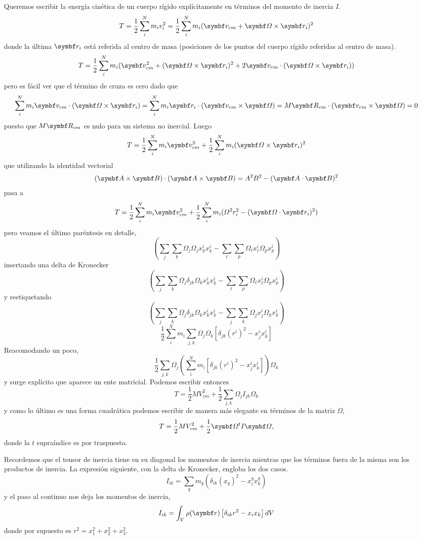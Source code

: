 \documentclass[10pt,oneside]{CBFT_book}
\begin{document}
Queremos escribir la energía cinética de un cuerpo rígido explícitamente en términos del momento
de inercia $I$.
\[
	T = \frac{1}{2} \sum_i^N m_i v_i^2 = \frac{1}{2} \sum_i^N m_i ( \vb{v}_{cm} + \vb{\Omega} \times \vb{r}_i ) ^2
\]
donde la última $\vb{r}_i$ está referida al centro de masa (posiciones de los puntos del cuerpo
rígido referidas al centro de masa).
\[
	T = \frac{1}{2} \sum_i^N m_i ( \vb{v}_{cm}^2 + (\vb{\Omega} \times \vb{r}_i)^2 +
		2 \vb{v}_{cm} \cdot (\vb{\Omega} \times \vb{r}_i)  )
\]
pero es fácil ver que el término de cruza es cero dado que 
\[
	\sum_i^N m_i \vb{v}_{cm} \cdot (\vb{\Omega} \times \vb{r}_i) = 
	\sum_i^N m_i \vb{r}_i \cdot ( \vb{v}_{cm} \times \vb{\Omega} ) = 
	M \vb{R}_{cm} \cdot ( \vb{v}_{cm} \times \vb{\Omega} ) = 0
\]
puesto que $M \vb{R}_{cm}$ es nulo para un sistema no inercial. Luego 
\[
	T = \frac{1}{2} \sum_i^N m_i \vb{v}_{cm}^2 + \frac{1}{2} \sum_i^N m_i (\vb{\Omega} \times \vb{r}_i)^2
\]
que utilizando la identidad vectorial
\[
	( \vb{A} \times \vb{B} )\cdot( \vb{A} \times \vb{B} ) =
	A^2 B^2 - (\vb{A} \cdot \vb{B})^2
\]
pasa a 
\[
	T = \frac{1}{2} \sum_i^N m_i \vb{v}_{cm}^2 +
	\frac{1}{2} \sum_i^N m_i ( \Omega^2 r_i^2 - (\vb{\Omega}\cdot\vb{r}_i)^2 )
\]
pero veamos el último paréntesis en detalle,
\[
	\left(\sum_j \sum_k \Omega_j \Omega_j x_k^i x_k^i - 
	\sum_\ell \sum_p \Omega_\ell x_\ell^i \Omega_p x_p^i \right)
\]
insertando una delta de Kronecker
\[
	\left(\sum_j \sum_k \Omega_j \delta_{jk}\Omega_k x_k^i x_k^i - 
	\sum_\ell \sum_p \Omega_\ell x_\ell^i \Omega_p x_p^i \right)
\]
y reetiquetando
\[
	\left(\sum_j \sum_k \Omega_j \delta_{jk}\Omega_k x_k^i x_k^i - 
	\sum_j \sum_k \Omega_j x_j^i \Omega_k x_k^i \right)
\]
\[
	\frac{1}{2} \sum_i^N m_i \sum_{j,k} \Omega_j\Omega_k 
	\left[ \delta_{jk}(r^i)^2 - x^i_j x^i_k \right]
\]
Reacomodando un poco,
\[
	\frac{1}{2} \sum_{j,k}  \Omega_j \left(  \sum_i^N m_i 
	\left[ \delta_{jk}(r^i)^2 - x^i_j x^i_k \right] \right) \Omega_k 
\]
y surge explícito que aparece un ente matricial. Podemos escribir
entonces
\[
	T = \frac{1}{2} M V^2_{cm} + \frac{1}{2} \sum_{j,k} \Omega_j I_{jk} \Omega_k 
\]
y como lo último es una forma cuadrática podemos escribir de manera más elegante
en términos de la matriz $\Omega$,
\[
	T = \frac{1}{2} M V^2_{cm} + \frac{1}{2} \vb{\Omega}^t I \vb{\Omega},
\]
donde la $t$ supraíndice es por traspuesto.

Recordemos que el tensor de inercia tiene en su diagonal los momentos de inercia
mientras que los términos fuera de la misma son los productos de inercia.
La expresión siguiente, con la delta de Kronecker, engloba los dos casos.
\[
	I_{ik} = \sum_q m_q \left( \delta_{ik} (x_q)^2 - x_i^q x_k^q \right)
\]
y el paso al continuo nos deja los momentos de inercia,
\[
	I_{ik} = \int_V \rho(\vb{r}) \left[ \delta_{ik}r^2 - x_i x_k \right] dV
\]
donde por supuesto es $r^2 = x_1^2 + x_2^2 + x_3^2$.
\end{document}
